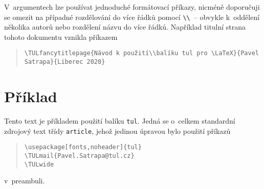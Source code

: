 \documentclass[a4paper,12pt,twoside]{article}
\newcommand{\cmdfont}[1]{\texttt{\color{\tulcolor}#1}}
\newcommand{\cmdnoindex}[1]{\cmdfont{\textbackslash #1}}
\begin{document}
V~argumentech lze používat jednoduché formátovací příkazy, nicméně
doporučuji se omezit na případné rozdělování do více řádků pomocí
\cmdnoindex{\textbackslash}~-- obvykle k~oddělení několika autorů nebo rozdělení
názvu do více řádků. Například titulní strana tohoto dokumentu vznikla
příkazem

\begin{quote}\begin{flushleft}
\cmdnoindex{TULfancytitlepage\{Návod k~použití\textbackslash\textbackslash balíku tul
pro \textbackslash LaTeX\}\{Pavel Satrapa\}\{Liberec 2020\}}
\end{flushleft}\end{quote}


\section{Příklad}

Tento text je příkladem použití balíku \cmdfont{tul}. Jedná se o~celkem
standardní zdrojový text třídy \cmdfont{article}, jehož jedinou úpravou bylo
použití příkazů

\begin{quote}
\cmdnoindex{usepackage[fonts,noheader]\{tul\}}\\
\cmdnoindex{TULmail\{Pavel.Satrapa@tul.cz\}}\\
\cmdnoindex{TULwide}
\end{quote}

v~preambuli.


\renewcommand{\indexname}{Přehled příkazů}
\printindex
\end{document}
